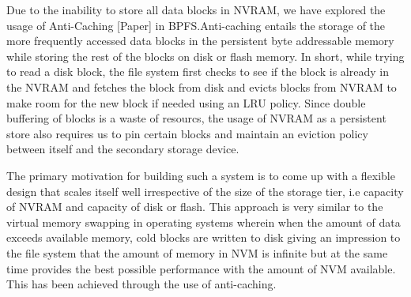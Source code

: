 Due to the inability to store all data blocks in NVRAM, we have explored the usage of Anti-Caching [Paper] in BPFS.Anti-caching entails the storage of the more frequently accessed data blocks in the persistent byte addressable memory while storing the rest of the blocks on disk or flash memory. In short, while trying to read a disk block, the file system first checks to see if the block is already in the NVRAM and fetches the block from disk and evicts blocks from NVRAM to make room for the new block if needed using an LRU policy. Since double buffering of blocks is a waste of resourcs, the usage of NVRAM as a persistent store also requires us to pin certain blocks and maintain an eviction policy between itself and the secondary storage device.

The primary motivation for building such a system is to come up with a flexible design that scales itself well irrespective of the size of the storage tier, i.e capacity of NVRAM and capacity of disk or flash. This approach is very similar to the virtual memory swapping in operating systems wherein when the amount of data exceeds available memory, cold blocks are written to disk giving an impression to the file system that the amount of memory in NVM is infinite but at the same time provides the best possible performance with the amount of NVM available. This has been achieved through the use of anti-caching. 



